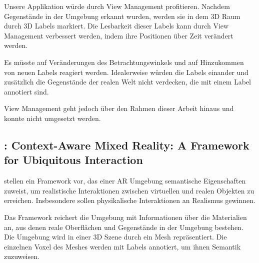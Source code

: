 %
%



Unsere Applikation würde durch View Management profitieren. Nachdem Gegenstände in der Umgebung erkannt wurden, werden sie in dem 3D Raum durch 3D Labels markiert. Die Lesbarkeit dieser Labels kann durch View Management verbessert werden, indem ihre Positionen über Zeit verändert werden. 

Es müsste auf Veränderungen des Betrachtungswinkels und auf Hinzukommen von neuen Labels reagiert werden. Idealerweise würden die Labels einander und zusätzlich die Gegenstände der realen Welt nicht verdecken, die mit einem Label annotiert sind. 

View Management geht jedoch über den Rahmen dieser Arbeit hinaus und konnte nicht umgesetzt werden. %



\subsection{\cite{contextawaremixedreality}: Context-Aware Mixed Reality: A Framework for Ubiquitous Interaction}

\cite{contextawaremixedreality} stellen ein Framework vor, das einer AR Umgebung semantische Eigenschaften zuweist, um realistische Interaktionen zwischen virtuellen und realen Objekten zu erreichen. 
Insbesondere sollen physikalische Interaktionen an Realismus gewinnen.

Das Framework reichert die Umgebung mit Informationen über die Materialien an, aus denen reale Oberflächen und Gegenstände in der Umgebung bestehen. Die Umgebung wird in einer 3D Szene durch ein Mesh repräsentiert. Die einzelnen Voxel des Meshes werden mit Labels annotiert, um ihnen Semantik zuzuweisen.

